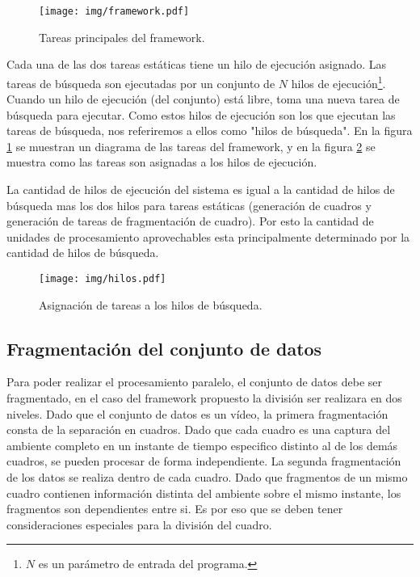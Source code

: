 \begin{figure}[!h]

	\texttt{[image: img/framework.pdf]}

	\caption{Tareas principales del framework.}

	\label{tareasFramework}

\end{figure}

Cada una de las dos tareas estáticas tiene un hilo de ejecución asignado. Las
tareas de búsqueda son ejecutadas por un conjunto de $N$ hilos de
ejecución\footnote{$N$ es un parámetro de entrada del programa.}. Cuando un hilo
de ejecución (del conjunto) está libre, toma una nueva tarea de búsqueda para
ejecutar. Como estos hilos de ejecución son los que ejecutan las tareas de
búsqueda, nos referiremos a ellos como "hilos de búsqueda". En la figura
\ref{tareasFramework} se muestran un diagrama de las tareas del framework, y en
la figura \ref{hilosFramework} se muestra como las tareas son asignadas a los
hilos de ejecución.

La cantidad de hilos de ejecución del sistema es igual a la cantidad de hilos de
búsqueda mas los dos hilos para tareas estáticas (generación de cuadros y
generación de tareas de fragmentación de cuadro). Por esto la cantidad de
unidades de procesamiento aprovechables esta principalmente determinado por la
cantidad de hilos de búsqueda.

\begin{figure}[!h]

	\texttt{[image: img/hilos.pdf]}

	\caption{Asignación de tareas a los hilos de búsqueda.}

	\label{hilosFramework}

\end{figure}

\subsection{Fragmentación del conjunto de datos}

Para poder realizar el procesamiento paralelo, el conjunto de datos debe ser
fragmentado, en el caso del framework propuesto la división ser realizara en dos
niveles. Dado que el conjunto de datos es un vídeo, la primera fragmentación
consta de la separación en cuadros. Dado que cada cuadro es una captura del
ambiente completo en un instante de tiempo especifico distinto al de los demás
cuadros, se pueden procesar de forma independiente. La segunda fragmentación de
los datos se realiza dentro de cada cuadro. Dado que fragmentos de un mismo
cuadro contienen información distinta del ambiente sobre el mismo instante, los
fragmentos son dependientes entre si. Es por eso que se deben tener
consideraciones especiales para la división del cuadro.

